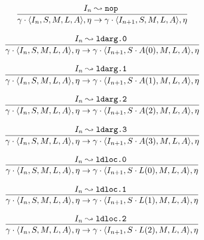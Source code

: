 \documentclass[declaration,shortabstract,english,mgr]{iithesis}
\newcommand{\mstate}[5] {
	\langle#1, #2, #3, #4, #5\rangle
}
\newcommand{\ipointsto}[3] {
	#1 \leadsto \texttt{#2} \text{ } #3
}
\begin{document}
\begin{equation}
\label{eq:semantics_nop}
	\infer{
		\gamma \cdot \mstate{I_n}{S}{M}{L}{A}, \eta
			\rightarrow
		\gamma \cdot \mstate{I_{n+1}}{S}{M}{L}{A}, \eta
	}
	{\ipointsto{I_n}{nop}}
\end{equation}

\begin{equation}
\label{eq:semantics_ldarg0}
	\infer{
		\gamma \cdot \mstate{I_n}{S}{M}{L}{A}, \eta
			\rightarrow
		\gamma \cdot \mstate{I_{n+1}}{S \cdot A(0)}{M}{L}{A}, \eta
	}
	{\ipointsto{I_n}{ldarg.0}}
\end{equation}

\begin{equation}
\label{eq:semantics_ldarg1}
	\infer{
		\gamma \cdot \mstate{I_n}{S}{M}{L}{A}, \eta
			\rightarrow
		\gamma \cdot \mstate{I_{n+1}}{S \cdot A(1)}{M}{L}{A}, \eta
	}
	{\ipointsto{I_n}{ldarg.1}}
\end{equation}

\begin{equation}
\label{eq:semantics_ldarg2}
	\infer{
		\gamma \cdot \mstate{I_n}{S}{M}{L}{A}, \eta
			\rightarrow
		\gamma \cdot \mstate{I_{n+1}}{S \cdot A(2)}{M}{L}{A}, \eta
	}
	{\ipointsto{I_n}{ldarg.2}}
\end{equation}

\begin{equation}
\label{eq:semantics_ldarg3}
	\infer{
		\gamma \cdot \mstate{I_n}{S}{M}{L}{A}, \eta
			\rightarrow
		\gamma \cdot \mstate{I_{n+1}}{S \cdot A(3)}{M}{L}{A}, \eta
	}
	{\ipointsto{I_n}{ldarg.3}}
\end{equation}

\begin{equation}
\label{eq:semantics_ldloc0}
	\infer{
		\gamma \cdot \mstate{I_n}{S}{M}{L}{A}, \eta
			\rightarrow
		\gamma \cdot \mstate{I_{n+1}}{S \cdot L(0)}{M}{L}{A}, \eta
	}
	{\ipointsto{I_n}{ldloc.0}}
\end{equation}

\begin{equation}
\label{eq:semantics_ldloc1}
	\infer{
		\gamma \cdot \mstate{I_n}{S}{M}{L}{A}, \eta
			\rightarrow
		\gamma \cdot \mstate{I_{n+1}}{S \cdot L(1)}{M}{L}{A}, \eta
	}
	{\ipointsto{I_n}{ldloc.1}}
\end{equation}

\begin{equation}
\label{eq:semantics_ldloc2}
	\infer{
		\gamma \cdot \mstate{I_n}{S}{M}{L}{A}, \eta
			\rightarrow
		\gamma \cdot \mstate{I_{n+1}}{S \cdot L(2)}{M}{L}{A}, \eta
	}
	{\ipointsto{I_n}{ldloc.2}}
\end{equation}
\end{document}

